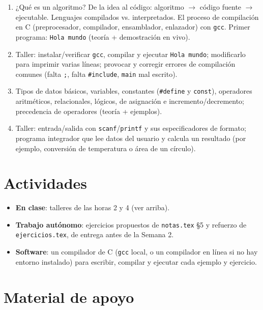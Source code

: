\documentclass[11pt,letterpaper]{article}
\begin{document}
\begin{enumerate}[leftmargin=1.2cm]
  \item[\textbf{Hora 1.}] ¿Qué es un algoritmo? De la idea al código: algoritmo $\to$ código fuente
        $\to$ ejecutable. Lenguajes compilados vs. interpretados. El proceso de compilación en C
        (preprocesador, compilador, ensamblador, enlazador) con \texttt{gcc}. Primer programa:
        \texttt{Hola mundo} (teoría + demostración en vivo).
  \item[\textbf{Hora 2.}] Taller: instalar/verificar \texttt{gcc}, compilar y ejecutar
        \texttt{Hola mundo}; modificarlo para imprimir varias líneas; provocar y corregir errores
        de compilación comunes (falta \texttt{;}, falta \texttt{\#include}, \texttt{main} mal
        escrito).
  \item[\textbf{Hora 3.}] Tipos de datos básicos, variables, constantes (\texttt{\#define} y
        \texttt{const}), operadores aritméticos, relacionales, lógicos, de asignación e
        incremento/decremento; precedencia de operadores (teoría + ejemplos).
  \item[\textbf{Hora 4.}] Taller: entrada/salida con \texttt{scanf}/\texttt{printf} y sus
        especificadores de formato; programa integrador que lee datos del usuario y calcula un
        resultado (por ejemplo, conversión de temperatura o área de un círculo).
\end{enumerate}

\section{Actividades}

\begin{itemize}[leftmargin=1.2cm]
  \item \textbf{En clase}: talleres de las horas 2 y 4 (ver arriba).
  \item \textbf{Trabajo autónomo}: ejercicios propuestos de \texttt{notas.tex} §5 y refuerzo de
        \texttt{ejercicios.tex}, de entrega antes de la Semana 2.
  \item \textbf{Software}: un compilador de C (\texttt{gcc} local, o un compilador en línea si no
        hay entorno instalado) para escribir, compilar y ejecutar cada ejemplo y ejercicio.
\end{itemize}

\section{Material de apoyo}
\end{document}
